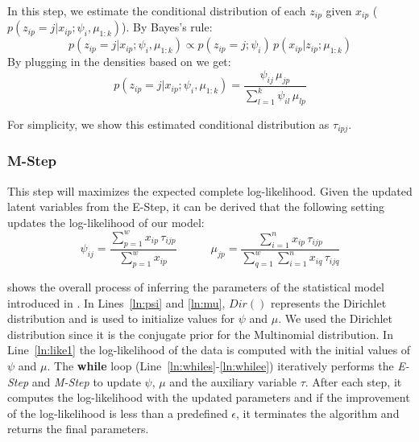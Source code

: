In this step, we estimate the conditional distribution of each $z_{ip}$ given $x_{ip}$ ($p(z_{ip} = j\vert x_{ip};\psi_i, \mu_{1:k})$). By Bayes's rule:
\begin{equation}
p(z_{ip} = j\vert x_{ip};\psi_i, \mu_{1:k}) \propto p(z_{ip} = j;\psi_i)\,p(x_{ip}\vert z_{ip};\mu_{1:k}) 
\end{equation}
By plugging in the densities based on  we get:
\begin{equation}
\label{eq:estep}
p(z_{ip} = j\vert x_{ip};\psi_i, \mu_{1:k}) = \frac{\psi_{ij}\,\mu_{jp}}{\sum_{l=1}^k \psi_{il}\,\mu_{lp}}
\end{equation}

For simplicity, we show this estimated conditional distribution as $\tau_{ipj}$.

\subsubsection{M-Step}

This step will maximizes the expected complete log-likelihood. Given the updated latent variables from the E-Step, it can be derived that the following setting updates the log-likelihood of our model:
\begin{equation}
\label{eq:mstep}
\psi_{ij} = \frac{\sum_{p=1}^w x_{ip}\,\tau_{ijp}}{\sum_{p=1}^w x_{ip}} \quad\quad\quad
\mu_{jp} = \frac{\sum_{i=1}^n x_{ip}\,\tau_{ijp}}{\sum_{q=1}^w\sum_{i=1}^n x_{iq}\,\tau_{ijq}}
\end{equation}

 shows the overall process of inferring the parameters of the statistical model introduced in . In Lines~\ref{ln:psi} and \ref{ln:mu}, $Dir()$ represents the Dirichlet distribution and is used to initialize values for $\psi$ and $\mu$. We used the Dirichlet distribution since it is the conjugate prior for the Multinomial distribution. In Line~\ref{ln:like1} the log-likelihood of the data is computed with the initial values of $\psi$ and $\mu$. The \textbf{while} loop (Line~\ref{ln:whiles}-\ref{ln:whilee}) iteratively performs the \emph{E-Step} and \emph{M-Step} to update $\psi$, $\mu$ and the auxiliary variable $\tau$. After each step, it computes the log-likelihood with the updated parameters and if the improvement of the log-likelihood is less than a predefined $\epsilon$, it terminates the algorithm and returns the final parameters.

